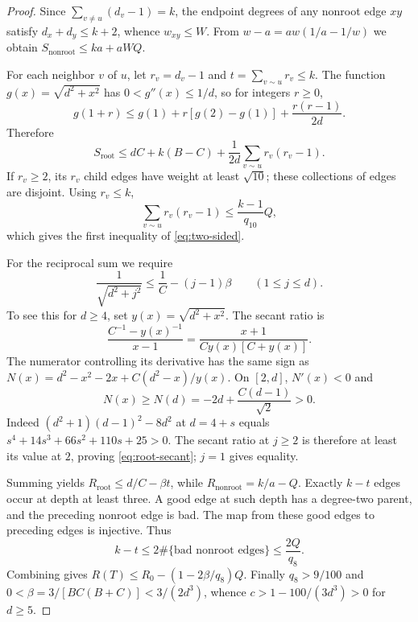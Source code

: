 \documentclass[11pt,a4paper]{article}
\numberwithin{equation}{section}
\begin{document}
\begin{proof}
Since $\sum_{v\ne u}(d_v-1)=k$, the endpoint degrees of any nonroot edge $xy$ satisfy $d_x+d_y\le k+2$, whence $w_{xy}\le W$. From
$w-a=aw(1/a-1/w)$ we obtain $S_{\mathrm{nonroot}}\le ka+aWQ$.

For each neighbor $v$ of $u$, let $r_v=d_v-1$ and $t=\sum_{v\sim u}r_v\le k$. The function $g(x)=\sqrt{d^2+x^2}$ has $0<g''(x)\le1/d$, so for integers $r\ge0$,
\[g(1+r)\le g(1)+r[g(2)-g(1)]+\frac{r(r-1)}{2d}.
\]
Therefore
\[S_{\mathrm{root}}\le dC+k(B-C)+\frac1{2d}\sum_{v\sim u}r_v(r_v-1).
\]
If $r_v\ge2$, its $r_v$ child edges have weight at least $\sqrt{10}$; these collections of edges are disjoint. Using $r_v\le k$,
\[\sum_{v\sim u}r_v(r_v-1)\le\frac{k-1}{q_{10}}Q,
\]
which gives the first inequality of \eqref{eq:two-sided}.

For the reciprocal sum we require
\begin{equation}\label{eq:root-secant}
\frac1{\sqrt{d^2+j^2}}\le\frac1C-(j-1)\beta\qquad(1\le j\le d).
\end{equation}
To see this for $d\ge4$, set $y(x)=\sqrt{d^2+x^2}$. The secant ratio is
\[\frac{C^{-1}-y(x)^{-1}}{x-1}=\frac{x+1}{Cy(x)[C+y(x)]}.
\]
The numerator controlling its derivative has the same sign as
$N(x)=d^2-x^2-2x+C(d^2-x)/y(x)$. On $[2,d]$, $N'(x)<0$ and
\[N(x)\ge N(d)=-2d+\frac{C(d-1)}{\sqrt2}>0.
\]
Indeed $(d^2+1)(d-1)^2-8d^2$ at $d=4+s$ equals
$s^4+14s^3+66s^2+110s+25>0$. The secant ratio at $j\ge2$ is therefore at least its value at $2$, proving \eqref{eq:root-secant}; $j=1$ gives equality.

Summing yields $R_{\mathrm{root}}\le d/C-\beta t$, while $R_{\mathrm{nonroot}}=k/a-Q$. Exactly $k-t$ edges occur at depth at least three. A good edge at such depth has a degree-two parent, and the preceding nonroot edge is bad. The map from these good edges to preceding edges is injective. Thus
\[k-t\le2\#\{\text{bad nonroot edges}\}\le\frac{2Q}{q_8}.
\]
Combining gives $R(T)\le R_0-(1-2\beta/q_8)Q$. Finally $q_8>9/100$ and
$0<\beta=3/[BC(B+C)]<3/(2d^3)$, whence
$c>1-100/(3d^3)>0$ for $d\ge5$.
\end{proof}
\end{document}
